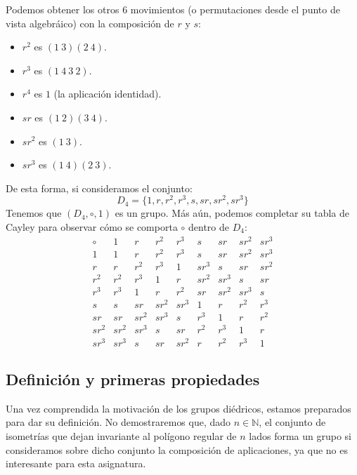 \begin{ejemplo}
    Podemos obtener los otros 6 movimientos (o permutaciones desde el punto de vista algebráico) con la composición de $r$ y $s$:
    \begin{itemize}
        \item $r^2$ es $(1\ 3)(2\ 4)$.
        \item $r^3$ es $(1\ 4\ 3\ 2)$.
        \item $r^4$ es $1$ (la aplicación identidad).
        \item $sr$ es $(1\ 2)(3\ 4)$.
        \item $sr^2$ es $(1\ 3)$.
        \item $sr^3$ es $(1\ 4)(2\ 3)$.
    \end{itemize}
    De esta forma, si consideramos el conjunto:
    \begin{equation*}
        D_4 = \{1, r, r^2, r^3, s, sr, sr^2, sr^3\}
    \end{equation*}
    Tenemos que $(D_4,\circ,1)$ es un grupo. Más aún, podemos completar su tabla de Cayley para observar cómo se comporta $\circ$ dentro de $D_4$:
    \begin{equation*}
        \begin{array}{c|cccccccc}
             \circ & 1 & r & r^2 & r^3 & s & sr & sr^2 & sr^3 \\
             \hline
                1 & 1 & r & r^2 & r^3 & s & sr & sr^2 & sr^3 \\
                r & r & r^2 & r^3 & 1 & sr^3 & s & sr & sr^2 \\
                r^2 & r^2 & r^3 & 1 & r & sr^2 & sr^3 & s & sr \\
                r^3 & r^3 & 1 & r & r^2 & sr & sr^2 & sr^3 & s \\
                s & s & sr & sr^2 & sr^3 & 1 & r & r^2 & r^3 \\
                sr & sr & sr^2 & sr^3 & s & r^3 & 1 & r & r^2 \\
                sr^2 & sr^2 & sr^3 & s & sr & r^2 & r^3 & 1 & r \\
                sr^3 & sr^3 & s & sr & sr^2 & r & r^2 & r^3 & 1 
        \end{array}
    \end{equation*}
\end{ejemplo}

\subsection{Definición y primeras propiedades}
Una vez comprendida la motivación de los grupos diédricos, estamos preparados para dar su definición. No demostraremos que, dado $n\in \mathbb{N}$, el conjunto de isometrías que dejan invariante al polígono regular de $n$ lados forma un grupo si consideramos sobre dicho conjunto la composición de aplicaciones, ya que no es interesante para esta asignatura.

